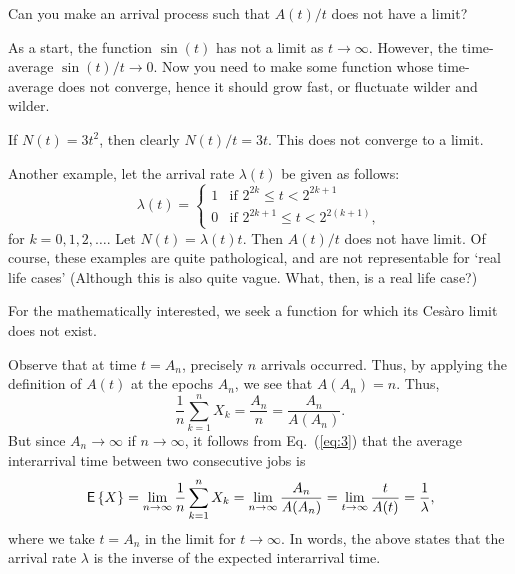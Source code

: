 \begin{exercise}
  Can you make an arrival process such that $A(t)/t$ does not have a
  limit?  
  \begin{hint}
As a start, the function $\sin(t)$ has not a limit as
    $t\to\infty$. However, the time-average $\sin(t)/t \to 0$.  Now
    you need to make some function whose time-average does not
    converge, hence it should grow fast, or fluctuate wilder and
    wilder.
  \end{hint}
  \begin{solution}
 If $N(t) = 3 t^2$, then clearly $N(t)/t = 3t$. This does not
    converge to a limit. 

  Another example, let the arrival rate $\lambda(t)$ be given as
    follows:
    \begin{equation*}
      \lambda(t) = 
    \begin{cases}
      1 & \text{if } 2^{2k} \leq t < 2^{2k+1} \\
      0 & \text{if } 2^{2k+1} \leq t < 2^{2(k+1)},
    \end{cases}
    \end{equation*}
    for $k=0,1,2,\ldots$. Let $N(t) = \lambda(t) t$. Then $A(t)/t$
    does not have limit. Of course, these examples are quite
    pathological, and are not representable for `real life cases'
    (Although this is also quite vague. What, then, is a real life
    case?)

For the mathematically interested, we seek a
    function for which its Ces\`aro limit does not exist.
  \end{solution}
\end{exercise}



Observe that at time $t=A_n$, precisely $n$ arrivals occurred. Thus,
by applying the definition of $A(t)$ at the epochs $A_n$, we see that
$A(A_n) = n$. Thus,
\begin{equation*}
  \frac{1}n\sum_{k=1}^n X_k = \frac{A_n}n = \frac{A_n}{A(A_n)}. 
\end{equation*}
But since $A_n\to\infty$ if $n\to\infty$, it follows from
Eq.~(\ref{eq:3}) that the average interarrival time between two
consecutive jobs is
\begin{equation}\label{eq:54}
  \,\mathsf{E}\left\{X\right\} = \lim_{n\to\infty}  \frac{1}n\sum_{k=1}^n X_k = \lim_{n\to \infty} \frac{A_n}{A(A_n)} = \lim_{t\to\infty} \frac t{A(t)} = \frac 1 \lambda,
\end{equation}
where we take $t=A_n$ in the limit for $t\to\infty$.  In words, the
above states that the arrival rate $\lambda$ is the inverse of the
expected interarrival time.

